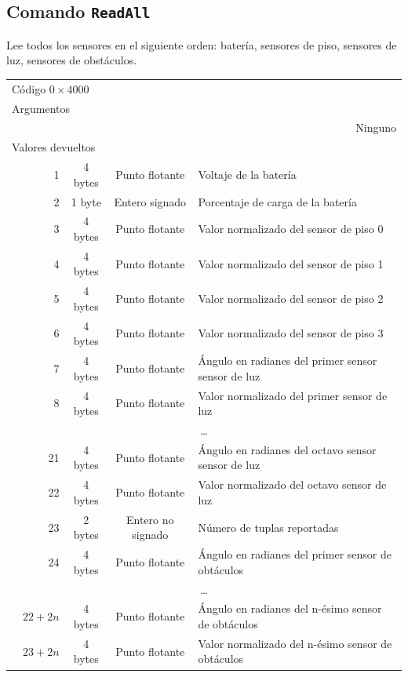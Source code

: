 \documentclass[letterpaper,10.5pt]{article}
\begin{document}
\subsection{Comando \texttt{ReadAll}}
Lee todos los sensores en el siguiente orden: batería, sensores de piso, sensores de luz, sensores de obstáculos.

\par\noindent
\begin{tabularx}{\linewidth}{p{1em} r c c X}
	\multicolumn{5}{X}{Código $0\times4000$}\\
	\multicolumn{5}{X}{Argumentos}\\
	&\multicolumn{4}{X}{Ninguno}\\
	\multicolumn{5}{X}{Valores devueltos}\\
	& 1 & 4 bytes & Punto flotante & Voltaje de la batería\\
	& 2 & 1 byte  & Entero signado & Porcentaje de carga de la batería\\
	& 3 & 4 bytes & Punto flotante & Valor normalizado del sensor de piso 0 \\
	& 4 & 4 bytes & Punto flotante & Valor normalizado del sensor de piso 1 \\
	& 5 & 4 bytes & Punto flotante & Valor normalizado del sensor de piso 2 \\
	& 6 & 4 bytes & Punto flotante & Valor normalizado del sensor de piso 3 \\
	& 7 & 4 bytes & Punto flotante & Ángulo en radianes del primer sensor sensor de luz \\
	& 8 & 4 bytes & Punto flotante & Valor normalizado del primer sensor de luz \\
	\multicolumn{5}{c}{\dots{}}\\
	&21 & 4 bytes & Punto flotante & Ángulo en radianes del octavo sensor sensor de luz \\
	&22 & 4 bytes & Punto flotante & Valor normalizado del octavo sensor de luz \\
	&23 & 2 bytes & Entero no signado & Número de tuplas reportadas \\
	&24 & 4 bytes & Punto flotante & Ángulo en radianes del primer sensor de obtáculos \\
	\multicolumn{5}{c}{\dots{}}\\
	&$22+2n$&4 bytes & Punto flotante & Ángulo en radianes del n-ésimo sensor de obtáculos \\
	&$23+2n$&4 bytes& Punto flotante& Valor normalizado del n-ésimo sensor de obtáculos \\
\end{tabularx}
\end{document}
